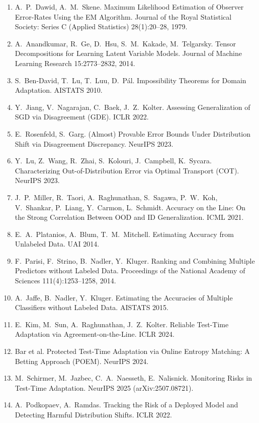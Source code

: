 \documentclass[conference]{IEEEtran}
\theoremstyle{plain}
\theoremstyle{definition}
\begin{document}
\begin{enumerate}
\item A.~P.~Dawid, A.~M.~Skene. Maximum Likelihood Estimation of Observer Error-Rates Using the EM Algorithm. Journal of the Royal Statistical Society: Series C (Applied Statistics) 28(1):20--28, 1979.
\item A.~Anandkumar, R.~Ge, D.~Hsu, S.~M.~Kakade, M.~Telgarsky. Tensor Decompositions for Learning Latent Variable Models. Journal of Machine Learning Research 15:2773--2832, 2014.
\item S.~Ben-David, T.~Lu, T.~Luu, D.~P\'al. Impossibility Theorems for Domain Adaptation. AISTATS 2010.
\item Y.~Jiang, V.~Nagarajan, C.~Baek, J.~Z.~Kolter. Assessing Generalization of SGD via Disagreement (GDE). ICLR 2022.
\item E.~Rosenfeld, S.~Garg. (Almost) Provable Error Bounds Under Distribution Shift via Disagreement Discrepancy. NeurIPS 2023.
\item Y.~Lu, Z.~Wang, R.~Zhai, S.~Kolouri, J.~Campbell, K.~Sycara. Characterizing Out-of-Distribution Error via Optimal Transport (COT). NeurIPS 2023.
\item J.~P.~Miller, R.~Taori, A.~Raghunathan, S.~Sagawa, P.~W.~Koh, V.~Shankar, P.~Liang, Y.~Carmon, L.~Schmidt. Accuracy on the Line: On the Strong Correlation Between OOD and ID Generalization. ICML 2021.
\item E.~A.~Platanios, A.~Blum, T.~M.~Mitchell. Estimating Accuracy from Unlabeled Data. UAI 2014.
\item F.~Parisi, F.~Strino, B.~Nadler, Y.~Kluger. Ranking and Combining Multiple Predictors without Labeled Data. Proceedings of the National Academy of Sciences 111(4):1253--1258, 2014.
\item A.~Jaffe, B.~Nadler, Y.~Kluger. Estimating the Accuracies of Multiple Classifiers without Labeled Data. AISTATS 2015.
\item E.~Kim, M.~Sun, A.~Raghunathan, J.~Z.~Kolter. Reliable Test-Time Adaptation via Agreement-on-the-Line. ICLR 2024.
\item Bar et al. Protected Test-Time Adaptation via Online Entropy Matching: A Betting Approach (POEM). NeurIPS 2024. %
\item M.~Schirmer, M.~Jazbec, C.~A.~Naesseth, E.~Nalisnick. Monitoring Risks in Test-Time Adaptation. NeurIPS 2025 (arXiv:2507.08721).
\item A.~Podkopaev, A.~Ramdas. Tracking the Risk of a Deployed Model and Detecting Harmful Distribution Shifts. ICLR 2022.

\end{enumerate}
\end{document}
